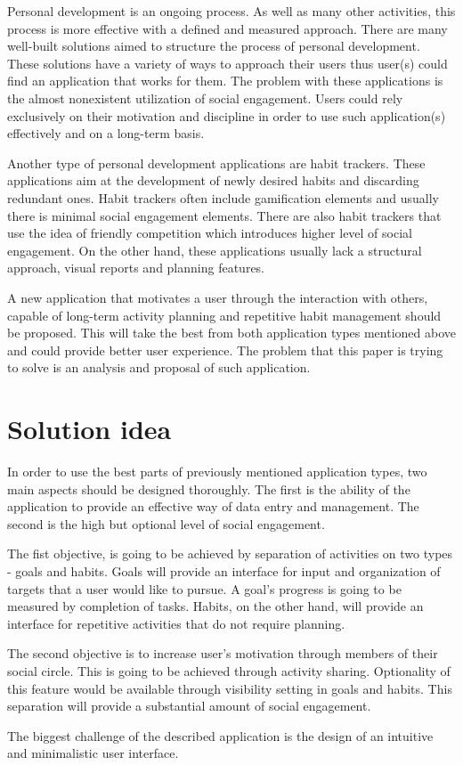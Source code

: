 Personal development is an ongoing process.
As well as many other activities, this process is more effective with a defined and measured approach.
There are many well-built solutions aimed to structure the process of personal development.
These solutions have a variety of ways to approach their users thus user(s) could find an application that works for them.
The problem with these applications is the almost nonexistent utilization of social engagement.
Users could rely exclusively on their motivation and discipline in order to use such application(s) effectively and on a long-term basis.

Another type of personal development applications are habit trackers.
These applications aim at the development of newly desired habits and discarding redundant ones.
Habit trackers often include gamification elements and usually there is minimal social engagement elements.
There are also habit trackers that use the idea of friendly competition which introduces higher level of social engagement.
On the other hand, these applications usually lack a structural approach, visual reports and planning features.

A new application that motivates a user through the interaction with others, capable of long-term activity planning and repetitive habit management should be proposed.
This will take the best from both application types mentioned above and could provide better user experience.
The problem that this paper is trying to solve is an analysis and proposal of such application.


\section{Solution idea}\label{sec:solution-idea}

In order to use the best parts of previously mentioned application types, two main aspects should be designed thoroughly.
The first is the ability of the application to provide an effective way of data entry and management.
The second is the high but optional level of social engagement.

The fist objective, is going to be achieved by separation of activities on two types - goals and habits.
Goals will provide an interface for input and organization of targets that a user would like to pursue.
A goal's progress is going to be measured by completion of tasks.
Habits, on the other hand, will provide an interface for repetitive activities that do not require planning.

The second objective is to increase user's motivation through members of their social circle.
This is going to be achieved through activity sharing.
Optionality of this feature would be available through visibility setting in goals and habits.
This separation will provide a substantial amount of social engagement.

The biggest challenge of the described application is the design of an intuitive and minimalistic user interface.
